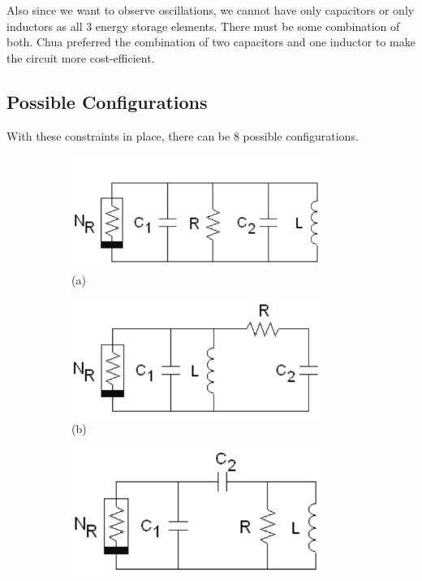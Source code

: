 \documentclass[12pt]{article}
\begin{document}
Also since we want to observe oscillations, we cannot have only capacitors or only inductors as all 3 energy storage elements. There must be some combination of both. Chua preferred the combination of two capacitors and one inductor to make the circuit more cost-efficient. 
%
\subsection{Possible Configurations}
With these constraints in place, there can be 8 possible configurations. 
\begin{figure}[H] %
	\centering
	\caption{Fig 1. Possible configurations for the circuit}
	\begin{subfigure}[b]{0.5\textwidth}
		\centering
		\includegraphics[width=0.9\textwidth]{Images/fig1(a).png}
		\caption{(a)}
		\label{fig:1a}
	\end{subfigure}%
	\begin{subfigure}[b]{0.5\textwidth}
		\centering
		\includegraphics[width=0.9\textwidth]{Images/fig1(b).png}
		\caption{(b)}
		\label{fig:1b}
	\end{subfigure}
	\begin{subfigure}[b]{0.5\textwidth}
		\centering
		\includegraphics[width=0.9\textwidth]{Images/fig1(c).png}

\end{subfigure}
\end{figure}
\end{document}
